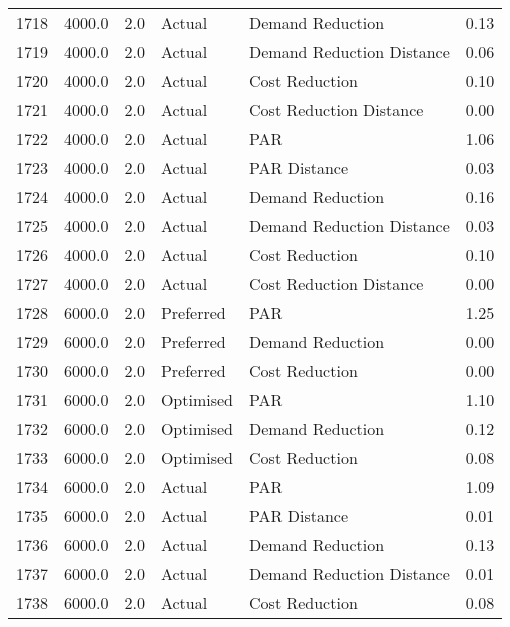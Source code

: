 \begin{longtable}{lrrllr}
1718 &       4000.0 &     2.0 &         Actual &           Demand Reduction &   0.13 \\
1719 &       4000.0 &     2.0 &         Actual &  Demand Reduction Distance &   0.06 \\
1720 &       4000.0 &     2.0 &         Actual &             Cost Reduction &   0.10 \\
1721 &       4000.0 &     2.0 &         Actual &    Cost Reduction Distance &   0.00 \\
1722 &       4000.0 &     2.0 &         Actual &                        PAR &   1.06 \\
1723 &       4000.0 &     2.0 &         Actual &               PAR Distance &   0.03 \\
1724 &       4000.0 &     2.0 &         Actual &           Demand Reduction &   0.16 \\
1725 &       4000.0 &     2.0 &         Actual &  Demand Reduction Distance &   0.03 \\
1726 &       4000.0 &     2.0 &         Actual &             Cost Reduction &   0.10 \\
1727 &       4000.0 &     2.0 &         Actual &    Cost Reduction Distance &   0.00 \\
1728 &       6000.0 &     2.0 &      Preferred &                        PAR &   1.25 \\
1729 &       6000.0 &     2.0 &      Preferred &           Demand Reduction &   0.00 \\
1730 &       6000.0 &     2.0 &      Preferred &             Cost Reduction &   0.00 \\
1731 &       6000.0 &     2.0 &      Optimised &                        PAR &   1.10 \\
1732 &       6000.0 &     2.0 &      Optimised &           Demand Reduction &   0.12 \\
1733 &       6000.0 &     2.0 &      Optimised &             Cost Reduction &   0.08 \\
1734 &       6000.0 &     2.0 &         Actual &                        PAR &   1.09 \\
1735 &       6000.0 &     2.0 &         Actual &               PAR Distance &   0.01 \\
1736 &       6000.0 &     2.0 &         Actual &           Demand Reduction &   0.13 \\
1737 &       6000.0 &     2.0 &         Actual &  Demand Reduction Distance &   0.01 \\
1738 &       6000.0 &     2.0 &         Actual &             Cost Reduction &   0.08 \\

\end{longtable}
